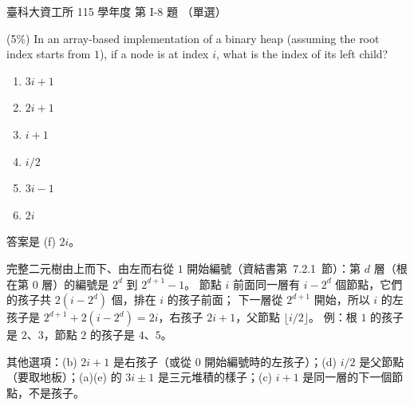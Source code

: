 \begin{pastexam}[label={px:ntust-115-ice-08}]{臺科大資工所 115 學年度 第 I-8 題}
（單選）

(5\%) In an array-based implementation of a binary heap (assuming the root index starts from $1$), if a node
is at index $i$, what is the index of its left child?
\begin{enumerate}[label=(\alph*)]
\item $3i+1$
\item $2i+1$
\item $i+1$
\item $i/2$
\item $3i-1$
\item $2i$
\end{enumerate}
\end{pastexam}

\begin{pastsoln}
答案是 (f) $2i$。

完整二元樹由上而下、由左而右從 $1$ 開始編號（資結書第~7.2.1~節）：第 $d$ 層（根在第 $0$ 層）的編號是
$2^d$ 到 $2^{d+1} - 1$。 節點 $i$ 前面同一層有 $i - 2^d$ 個節點，它們的孩子共 $2(i - 2^d)$ 個，排在 $i$ 的孩子前面；
下一層從 $2^{d+1}$ 開始，所以 $i$ 的左孩子是 $2^{d+1} + 2(i - 2^d) = 2i$，右孩子 $2i + 1$，父節點
$\lfloor i/2 \rfloor$。 例：根 $1$ 的孩子是 $2$、$3$，節點 $2$ 的孩子是 $4$、$5$。

其他選項：(b) $2i + 1$ 是右孩子（或從 $0$ 開始編號時的左孩子）；(d) $i/2$ 是父節點（要取地板）；(a)(e) 的 $3i \pm 1$
是三元堆積的樣子；(c) $i + 1$ 是同一層的下一個節點，不是孩子。
\end{pastsoln}
